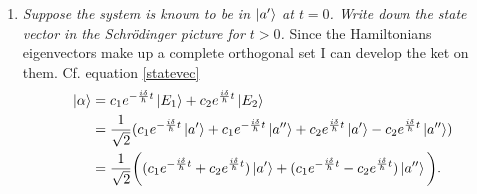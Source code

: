 \begin{example}
\begin{enumerate}
\begin{equation}
\begin{bmatrix}
			\end{bmatrix}.
		\end{equation} 
		I use only one of the linearly dependent equations from each eigenvalue along with a normalization requirement ($\braket{1|E_n}^2+\braket{2|E_n}^2=1$), to find the eigenvectors. I find
		\begin{equation}
			\lambda_1=E_1=\delta\Rightarrow
			\ket{E_1}=\begin{bmatrix}
				\braket{a'|E_1}\\
				\braket{a''|E_1}\\
			\end{bmatrix}=\frac{1}{\sqrt{2}}\begin{bmatrix}
				1\\
				1\\
			\end{bmatrix}=\frac{1}{\sqrt{2}}(\ket{a'}+\ket{a''}),
		\end{equation} 
		\begin{equation}
			\lambda_2=E_2=-\delta\Rightarrow
			\ket{E_2}=\begin{bmatrix}
				\braket{a'|E_2}\\
				\braket{a''|E_2}\\
			\end{bmatrix}=\frac{1}{\sqrt{2}}\begin{bmatrix}
				1\\
				-1\\
			\end{bmatrix}=\frac{1}{\sqrt{2}}(\ket{a'}-\ket{a''}).
		\end{equation} 
		\item \emph{Suppose the system is known to be in $\ket{a'}$ at $t=0$. Write down the state vector in the Schrödinger picture for $t>0$.}\newline
		Since the Hamiltonians eigenvectors make up a complete orthogonal set I can develop the ket on them. Cf. equation \eqref{statevec}
		\begin{equation}
			\begin{split}
				\ket{\alpha}&=c_1e^{-\frac{i\delta}{\hbar}t}\ket{E_1}+c_2e^{\frac{i\delta}{\hbar}t}\ket{E_2}\\
				&=\frac{1}{\sqrt{2}}(c_1e^{-\frac{i\delta}{\hbar}t}\ket{a'}+c_1e^{-\frac{i\delta}{\hbar}t}\ket{a''}+c_2e^{\frac{i\delta}{\hbar}t}\ket{a'}-c_2e^{\frac{i\delta}{\hbar}t}\ket{a''})\\
				&=\frac{1}{\sqrt{2}}\bigg((c_1e^{-\frac{i\delta}{\hbar}t}+c_2e^{\frac{i\delta}{\hbar}t})\ket{a'}+(c_1e^{-\frac{i\delta}{\hbar}t}-c_2e^{\frac{i\delta}{\hbar}t})\ket{a''}\bigg).\\

\end{split}
\end{equation}
\end{enumerate}
\end{example}

